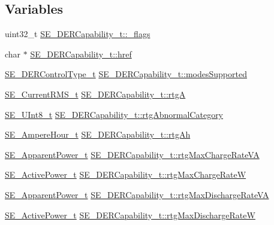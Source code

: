 \subsection*{Variables}
\begin{DoxyCompactItemize}
\item 
uint32\+\_\+t \hyperlink{group__DERCapability_ga0f194b8e66999993dad21c45fe22d0c7}{S\+E\+\_\+\+D\+E\+R\+Capability\+\_\+t\+::\+\_\+flags}
\item 
char $\ast$ \hyperlink{group__DERCapability_gae473d708806e294b5acbc9e455497af9}{S\+E\+\_\+\+D\+E\+R\+Capability\+\_\+t\+::href}
\item 
\hyperlink{group__DERControlType_gae0eefcd49e1cd98d709327c88f20a76b}{S\+E\+\_\+\+D\+E\+R\+Control\+Type\+\_\+t} \hyperlink{group__DERCapability_gaeb2956e3adf1befb4d62ab1e2aa1de5c}{S\+E\+\_\+\+D\+E\+R\+Capability\+\_\+t\+::modes\+Supported}
\item 
\hyperlink{structSE__CurrentRMS__t}{S\+E\+\_\+\+Current\+R\+M\+S\+\_\+t} \hyperlink{group__DERCapability_gae76648932f07be5a38c825f934fbe002}{S\+E\+\_\+\+D\+E\+R\+Capability\+\_\+t\+::rtgA}
\item 
\hyperlink{group__UInt8_gaf7c365a1acfe204e3a67c16ed44572f5}{S\+E\+\_\+\+U\+Int8\+\_\+t} \hyperlink{group__DERCapability_ga6aee5c16aef59e2683c53aa58c13dee8}{S\+E\+\_\+\+D\+E\+R\+Capability\+\_\+t\+::rtg\+Abnormal\+Category}
\item 
\hyperlink{structSE__AmpereHour__t}{S\+E\+\_\+\+Ampere\+Hour\+\_\+t} \hyperlink{group__DERCapability_ga259b7c7654bd92928ea31dac53ebda20}{S\+E\+\_\+\+D\+E\+R\+Capability\+\_\+t\+::rtg\+Ah}
\item 
\hyperlink{structSE__ApparentPower__t}{S\+E\+\_\+\+Apparent\+Power\+\_\+t} \hyperlink{group__DERCapability_ga0e2378d8fdea4d48fb51d2f8d5b4b936}{S\+E\+\_\+\+D\+E\+R\+Capability\+\_\+t\+::rtg\+Max\+Charge\+Rate\+VA}
\item 
\hyperlink{structSE__ActivePower__t}{S\+E\+\_\+\+Active\+Power\+\_\+t} \hyperlink{group__DERCapability_ga36c8c55fa197038f70f83697f985446d}{S\+E\+\_\+\+D\+E\+R\+Capability\+\_\+t\+::rtg\+Max\+Charge\+RateW}
\item 
\hyperlink{structSE__ApparentPower__t}{S\+E\+\_\+\+Apparent\+Power\+\_\+t} \hyperlink{group__DERCapability_ga68954554c11aab995b225b64dcae7501}{S\+E\+\_\+\+D\+E\+R\+Capability\+\_\+t\+::rtg\+Max\+Discharge\+Rate\+VA}
\item 
\hyperlink{structSE__ActivePower__t}{S\+E\+\_\+\+Active\+Power\+\_\+t} \hyperlink{group__DERCapability_gaf6967bed463f21a9877a155c994753d2}{S\+E\+\_\+\+D\+E\+R\+Capability\+\_\+t\+::rtg\+Max\+Discharge\+RateW}

\end{DoxyCompactItemize}

